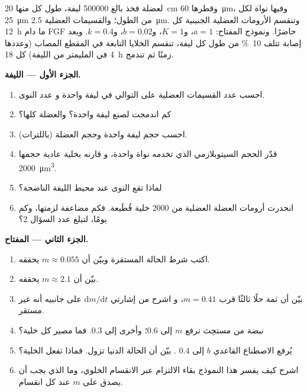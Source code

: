 \begin{problem}
\label{pb:b2:cell-differentiation:1}
لعضلة فخذ بالغ \num{500000} ليفة، طول كل منها
\qty{20}{cm} وقطرها \qty{60}{\micro m}، وفيها
نواة لكل \qty{25}{\micro m} من الطول؛ والقسيمات العضلية
\qty{2.5}{\micro m}. وتنقسم الأرومات العضلية الجنينية كل \qty{12}{h}
ما دام FGF حاضرًا. ونموذج المفتاح: $a = 1$، و$K = 1$، و$b = 0.02$، و$k
= 0.4$. وبعد إصابة تتلف \qty{10}{\%} من طول كل ليفة،
تنقسم الخلايا التابعة في المقطع المصاب (وعددها \num{4} في
المليمتر من الليفة) كل \qty{18}{h} زمنًا ثم تندمج.

\medskip
\noindent\textbf{الجزء الأول --- الليفة.}
\begin{enumerate}
  \item احسب عدد القسيمات العضلية على التوالي في ليفة واحدة و
        عدد النوى.
  \item كم  اندمجت لصنع ليفة واحدة؟ والعضلة كلها؟
  \item احسب حجم ليفة واحدة وحجم العضلة (باللترات).
  \item قدّر الحجم السيتوبلازمي الذي تخدمه نواة واحدة، و
        قارنه بخلية عادية حجمها \qty{2000}{\micro m^3}.
  \item لماذا تقع النوى عند محيط الليفة الناضجة؟
  \item انحدرت أرومات العضلة العضلية من \num{2000} خلية
        قُطَيعة. فكم مضاعفة لزمتها، وكم يومًا،
        لتبلغ عدد السؤال 2؟
\end{enumerate}

\medskip
\noindent\textbf{الجزء الثاني --- المفتاح.}
\begin{enumerate}[resume]
  \item اكتب شرط الحالة المستقرة وبيّن أن $m \approx
        0.055$ يحققه.
  \item بيّن أن $m \approx 2.1$ يحققه.
  \item بيّن أن ثمة حلًا ثالثًا قرب $m = 0.41$، و
        اشرح من إشارتي $\mathrm{d}m/\mathrm{d}t$ على جانبيه
        أنه غير مستقر.
  \item نبضة من مستحِث ترفع $m$ إلى $0.6$؛ وأخرى إلى $0.3$.
        فما مصير كل خلية؟
  \item يُرفع الاصطناع القاعدي $b$ إلى $0.4$ .
        بيّن أن الحالة الدنيا تزول. فماذا تفعل الخلية؟
  \item اشرح كيف يفسر هذا النموذج بقاء الالتزام عبر
        الانقسام الخلوي، وما الذي يجب أن يصدق على $m$ عند كل انقسام.
\end{enumerate}


\end{problem}
